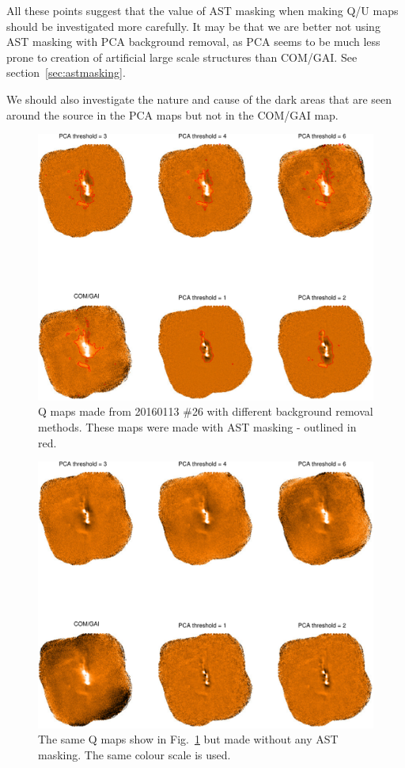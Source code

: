 \documentclass[twoside,11pt]{starlink}
\begin{document}
All these points suggest that the value of AST masking when making Q/U maps
should be investigated more carefully. It may be that we are better not
using AST masking with PCA background removal, as PCA seems to be much
less prone to creation of artificial large scale structures than COM/GAI.
See section~\ref{sec:astmasking}.

We should also investigate the nature and cause of the dark areas that
are seen around the source in the PCA maps but not in the COM/GAI map.

\begin{figure}
\includegraphics[width=\columnwidth]{pcawithast}
\caption{Q maps made from 20160113 \#26 with different background removal
methods. These maps were made with AST masking - outlined in red.}
\label{fig:pcawithast}
\end{figure}


\begin{figure}
\includegraphics[width=\columnwidth]{pcanoast}
\caption{The same Q maps show in Fig.~\ref{fig:pcawithast} but made
without any AST masking. The same colour scale is used.}
\label{fig:pcanoast}
\end{figure}
\end{document}
